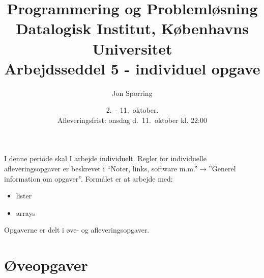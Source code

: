 \documentclass[a4paper,12pt]{article}
\title{Programmering og Problemløsning\\Datalogisk Institut,
  Københavns Universitet\\Arbejdsseddel 5 - individuel opgave}
\author{Jon Sporring}
\date{2.\ - 11.\ oktober.\\Afleveringsfrist: onsdag d.\ 11.\ oktober kl. 22:00}
\begin{document}
\maketitle

\noindent
I denne periode skal I arbejde individuelt. Regler for individuelle afleveringsopgaver er beskrevet i ``Noter, links, software m.m.''$\rightarrow$''Generel information om opgaver''. Formålet er at arbejde med:
\begin{itemize}
\item lister
\item arrays
\end{itemize}

Opgaverne er delt i øve- og afleveringsopgaver. 

\section*{Øveopgaver}
\end{document}
